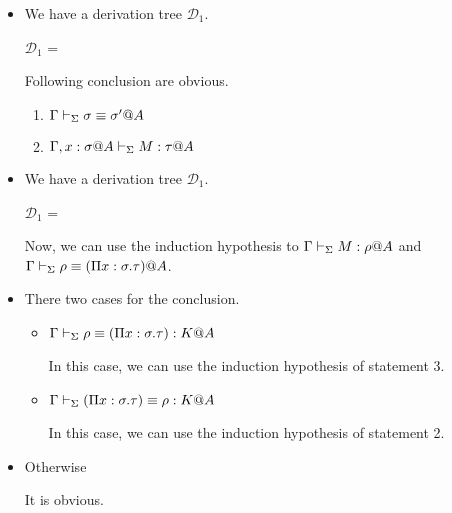 \begin{itemize}
	\item \TAbs
	      	      	      
	      We have a derivation tree $\mathcal{D}_1$.
	      	      	      
	      $\mathcal{D}_1$ = 
	      { \andalso {}}
	      	      	      
	      Following conclusion are obvious.
	      \begin{enumerate}
	      	\item $\Gamma \vdash_\Sigma \sigma \equiv \sigma'@A$
	      	\item $\G ,x:\sigma@A\V M:\tau@A$
	      \end{enumerate}
	      	      	      
	\item \TConv
	      	      	      
	      We have a derivation tree $\mathcal{D}_1$.
	      	      	      
	      $\mathcal{D}_1$ = 
	      { \andalso {}}
	      	      	      
	      Now, we can use the induction hypothesis to $\G \V M : \rho@A$ and $\Gamma \vdash_\Sigma \rho \equiv (\Pi x:\sigma.\tau)@A$.
	      	      	      
	\item \QTRefl
	      	      	      
	      There two cases for the conclusion.
	      \begin{itemize}
	      	\item $\Gamma \vdash_\Sigma \rho \equiv (\Pi x:\sigma.\tau) : K @A$
	      	      	      	      	      	      
	      	      In this case, we can use the induction hypothesis of statement 3.
	      	\item $\Gamma \vdash_\Sigma (\Pi x:\sigma.\tau) \equiv \rho : K @A$
	      	      	      	      	      	      
	      	      In this case, we can use the induction hypothesis of statement 2.
	      \end{itemize}
	      	      	      
	\item Otherwise
	      	      	      
	      It is obvious.
	      	      	      
\end{itemize}

